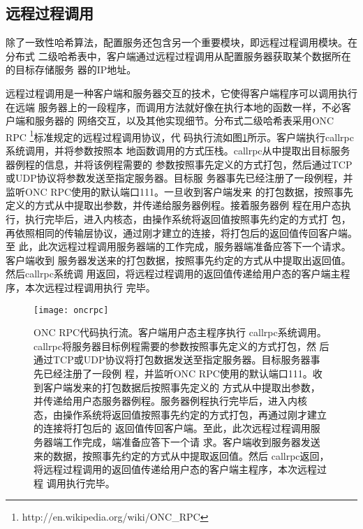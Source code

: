 \subsection{远程过程调用}
除了一致性哈希算法，配置服务还包含另一个重要模块，即远程过程调用模块。在分布式
二级哈希表中，客户端通过远程过程调用从配置服务器获取某个数据所在的目标存储服务
器的IP地址。

远程过程调用是一种客户端和服务器交互的技术，它使得客户端程序可以调用执行在远端
服务器上的一段程序，而调用方法就好像在执行本地的函数一样，不必客户端和服务器的
网络交互，以及其他实现细节。分布式二级哈希表采用ONC RPC
\footnote{http://en.wikipedia.org/wiki/ONC\_RPC}标准规定的远程过程调用协议，代
码执行流如图\ref{figure:oncrpc}所示。客户端执行callrpc系统调用，并将参数按照本
地函数调用的方式压栈。callrpc从中提取出目标服务器例程的信息，并将该例程需要的
参数按照事先定义的方式打包，然后通过TCP或UDP协议将参数发送至指定服务器。目标服
务器事先已经注册了一段例程，并监听ONC RPC使用的默认端口111。一旦收到客户端发来
的打包数据，按照事先定义的方式从中提取出参数，并传递给服务器例程。接着服务器例
程在用户态执行，执行完毕后，进入内核态，由操作系统将返回值按照事先约定的方式打
包，再依照相同的传输层协议，通过刚才建立的连接，将打包后的返回值传回客户端。至
此，此次远程过程调用服务器端的工作完成，服务器端准备应答下一个请求。客户端收到
服务器发送来的打包数据，按照事先约定的方式从中提取出返回值。然后callrpc系统调
用返回，将远程过程调用的返回值传递给用户态的客户端主程序，本次远程过程调用执行
完毕。
\begin{figure}
  \centering
  \texttt{[image: oncrpc]}
  \caption[ONC RPC代码执行流]{ONC RPC代码执行流。客户端用户态主程序执行
  callrpc系统调用。callrpc将服务器目标例程需要的参数按照事先定义的方式打包，然
  后通过TCP或UDP协议将打包数据发送至指定服务器。目标服务器事先已经注册了一段例
  程，并监听ONC RPC使用的默认端口111。收到客户端发来的打包数据后按照事先定义的
  方式从中提取出参数，并传递给用户态服务器例程。服务器例程执行完毕后，进入内核
  态，由操作系统将返回值按照事先约定的方式打包，再通过刚才建立的连接将打包后的
  返回值传回客户端。至此，此次远程过程调用服务器端工作完成，端准备应答下一个请
  求。客户端收到服务器发送来的数据，按照事先约定的方式从中提取返回值。然后
  callrpc返回，将远程过程调用的返回值传递给用户态的客户端主程序，本次远程过程
  调用执行完毕。}
  \label{figure:oncrpc}
\end{figure}

